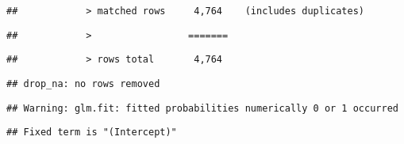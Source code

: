 \documentclass[
]{article}
\begin{document}
\begin{verbatim}
##            > matched rows     4,764    (includes duplicates)
\end{verbatim}

\begin{verbatim}
##            >                 =======
\end{verbatim}

\begin{verbatim}
##            > rows total       4,764
\end{verbatim}

\begin{verbatim}
## drop_na: no rows removed
\end{verbatim}

\begin{verbatim}
## Warning: glm.fit: fitted probabilities numerically 0 or 1 occurred
\end{verbatim}

\begin{verbatim}
## Fixed term is "(Intercept)"
\end{verbatim}
\end{document}

